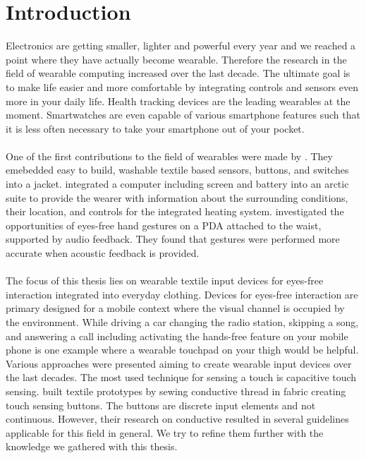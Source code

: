 %

\chapter{Introduction}
\label{introduction}
 
Electronics are getting smaller, lighter and powerful every year and we reached a point where they have actually become wearable. Therefore the research in the field of wearable computing increased over the last decade. The ultimate goal is to make life easier and more comfortable by integrating controls and sensors even more in your daily life. Health tracking devices are the leading wearables at the moment. Smartwatches are even capable of various smartphone features such that it is less often necessary to take your smartphone out of your pocket. \\ \\
One of the first contributions to the field of wearables were made by \cite{post1997smart}. They emebedded easy to build, washable textile based sensors, buttons, and switches into a jacket. \cite{Rantanen:2002:SCP:594096.594098} integrated a computer including  screen and battery into an arctic suite to provide the wearer with information about the surrounding conditions, their location, and controls for the integrated heating system. \cite{Brewster:2003:MEI:642611.642694} investigated the opportunities of eyes-free hand gestures on a PDA attached to the waist, supported by audio feedback. They found that gestures were performed more accurate when acoustic feedback is provided.\\ \\
The focus of this thesis lies on wearable textile input devices for eyes-free interaction integrated into everyday clothing. Devices for eyes-free interaction are primary designed for a mobile context where the visual channel is occupied by the environment. While driving a car changing the radio station, skipping a song, and answering a call including activating the hands-free feature on your mobile phone is one example where a wearable touchpad on your thigh would be helpful. Various approaches were presented aiming to create wearable input devices over the last decades. The most used technique for sensing a touch is capacitive touch  sensing. \citep{Holleis:2008:ECT:1409240.1409250} built textile prototypes by sewing conductive thread in fabric creating touch sensing buttons. The buttons are discrete input elements and not continuous. However, their research on conductive resulted in several guidelines applicable for this field in general. We try to refine them further with the knowledge we gathered with this thesis. \\ \\

